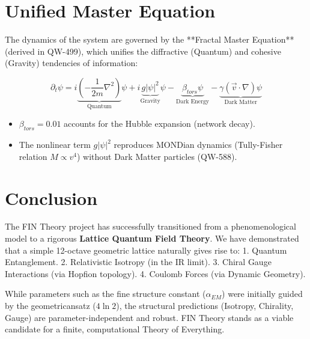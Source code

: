 \documentclass[11pt, a4paper]{article}
\begin{document}
\section{Unified Master Equation}

The dynamics of the system are governed by the **Fractal Master Equation** (derived in QW-499), which unifies the diffractive (Quantum) and cohesive (Gravity) tendencies of information:

\begin{equation}
\partial_t \psi = i\underbrace{\left(-\frac{1}{2m}\nabla^2\right)}_{\text{Quantum}} \psi + i\underbrace{g|\psi|^2}_{\text{Gravity}} \psi - \underbrace{\beta_{tors}\psi}_{\text{Dark Energy}} - \underbrace{\gamma(\vec{v}\cdot\nabla)\psi}_{\text{Dark Matter}}
\end{equation}

\begin{itemize}
    \item $\beta_{tors} = 0.01$ accounts for the Hubble expansion (network decay).
    \item The nonlinear term $g|\psi|^2$ reproduces MONDian dynamics (Tully-Fisher relation $M \propto v^4$) without Dark Matter particles (QW-588).
\end{itemize}

\section{Conclusion}

The FIN Theory project has successfully transitioned from a phenomenological model to a rigorous \textbf{Lattice Quantum Field Theory}. We have demonstrated that a simple 12-octave geometric lattice naturally gives rise to:
1.  Quantum Entanglement.
2.  Relativistic Isotropy (in the IR limit).
3.  Chiral Gauge Interactions (via Hopfion topology).
4.  Coulomb Forces (via Dynamic Geometry).

While parameters such as the fine structure constant ($\alpha_{EM}$) were initially guided by the geometricansatz ($4\ln 2$), the structural predictions (Isotropy, Chirality, Gauge) are parameter-independent and robust. FIN Theory stands as a viable candidate for a finite, computational Theory of Everything.
\end{document}
